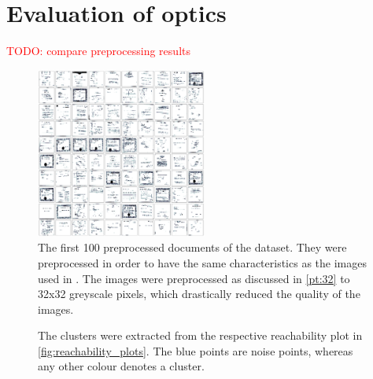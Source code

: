 \section{Evaluation of \acs{optics}}\label{sec:evaluation-OPTICS}

\textcolor{red}{TODO: compare preprocessing results}


\begin{figure}[htp] %
    \centering
    \includegraphics[width=0.5\textwidth]{images/OPTICS/32x32/preprocessed_docs.pdf}
    \caption{The first 100 preprocessed documents of the dataset.
    They were preprocessed in order to have the same characteristics as the images used in \cite{OPTICS1999}.
    The images were preprocessed as discussed in \autoref{pt:32} to 32x32 greyscale pixels, which drastically reduced the quality of the images.
    }
    \label{fig:preprocessed_docs_32x32}
\end{figure}




\begin{figure}%
    \centering
    \qquad
    \caption{The clusters were extracted from the respective reachability plot in \autoref{fig:reachability_plots}.
    The blue points are noise points, whereas any other colour denotes a cluster.}%
    \label{fig:optics_cluster}%
\end{figure}